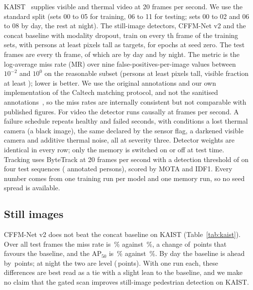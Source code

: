 KAIST~\cite{hwang2015kaist} supplies visible and thermal video at 20 frames per second. We use the standard split (sets 00 to 05 for training, 06 to 11 for testing; sets 00 to 02 and 06 to 08 by day, the rest at night). The still-image detectors, CFFM-Net v2 and the concat baseline with modality dropout, train on every \cfgKaistTrainStride{}th frame of the training sets, with persons at least \cfgKaistTrainMinH{} pixels tall as targets, for \cfgKaistEpochs{} epochs at seed zero. The test frames are every \cfgKaistTestStride{}th frame, \kstNAll{} of which \kstNDay{} are by day and \kstNNight{} by night. The metric is the log-average miss rate (MR) over nine false-positives-per-image values between $10^{-2}$ and $10^{0}$ on the reasonable subset (persons at least \cfgKaistMinH{} pixels tall, visible fraction at least \cfgKaistMinVis{}); lower is better. We use the original annotations and our own implementation of the Caltech matching protocol, and not the sanitised annotations~\cite{li2018kaistsanitized}, so the miss rates are internally consistent but not comparable with published figures. For video the detector runs causally at \cfgFailFps{} frames per second. A failure schedule repeats \cfgFailSeconds{} healthy and \cfgFailSeconds{} failed seconds, with conditions a lost thermal camera (a black image), the same declared by the sensor flag, a darkened visible camera and additive thermal noise, all at severity three. Detector weights are identical in every row; only the memory is switched on or off at test time. Tracking uses ByteTrack at 20 frames per second with a detection threshold of \cfgTrackConf{} on four test sequences (\trkUniqueTotal{} annotated persons), scored by MOTA and IDF1. Every number comes from one training run per model and one memory run, so no seed spread is available.

\subsection{Still images}
\label{sec:kaiststills}

CFFM-Net v2 does not beat the concat baseline on KAIST (Table~\ref{tab:kaist}). Over all test frames the miss rate is \kstCffmAllMr{}\,\% against \kstConcatAllMr{}\,\%, a change of \kstMarginAllMr{}\,points that favours the baseline, and the AP$_{50}$ is \kstCffmAllApFifty{}\,\% against \kstConcatAllApFifty{}\,\%. By day the baseline is ahead by \kstMarginDayMr{}\,points; at night the two are level (\kstMarginNightMr{}\,points). With one run each, these differences are best read as a tie with a slight lean to the baseline, and we make no claim that the gated scan improves still-image pedestrian detection on KAIST.

